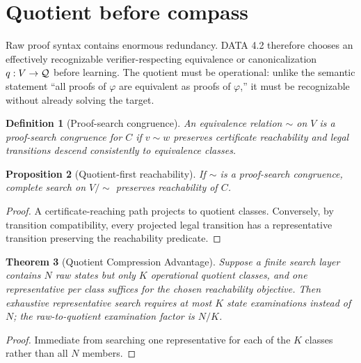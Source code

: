\documentclass[11pt]{article}
\newtheorem{theorem}{Theorem}[section]\newtheorem{corollary}[theorem]{Corollary}\newtheorem{proposition}[theorem]{Proposition}\newtheorem{conjecture}[theorem]{Conjecture}\newtheorem{definition}[theorem]{Definition}\newtheorem{remark}[theorem]{Remark}
\begin{document}
\section{Quotient before compass}
Raw proof syntax contains enormous redundancy. DATA 4.2 therefore chooses an effectively recognizable verifier-respecting equivalence or canonicalization $q:V\to\mathcal Q$ before learning. The quotient must be operational: unlike the semantic statement ``all proofs of $\varphi$ are equivalent as proofs of $\varphi$,'' it must be recognizable without already solving the target.
\begin{definition}[Proof-search congruence]An equivalence relation $\sim$ on $V$ is a proof-search congruence for $C$ if $v\sim w$ preserves certificate reachability and legal transitions descend consistently to equivalence classes.\end{definition}
\begin{proposition}[Quotient-first reachability]If $\sim$ is a proof-search congruence, complete search on $V/\!\sim$ preserves reachability of $C$.\end{proposition}
\begin{proof}A certificate-reaching path projects to quotient classes. Conversely, by transition compatibility, every projected legal transition has a representative transition preserving the reachability predicate.\end{proof}
\begin{theorem}[Quotient Compression Advantage]Suppose a finite search layer contains $N$ raw states but only $K$ operational quotient classes, and one representative per class suffices for the chosen reachability objective. Then exhaustive representative search requires at most $K$ state examinations instead of $N$; the raw-to-quotient examination factor is $N/K$.\end{theorem}
\begin{proof}Immediate from searching one representative for each of the $K$ classes rather than all $N$ members.\end{proof}
\end{document}
